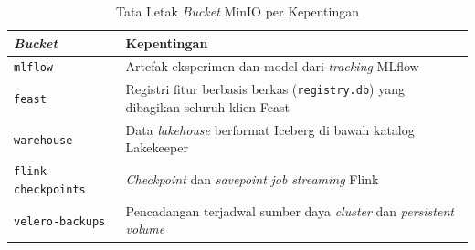 \begin{table}[!htb]
\centering
\caption{Tata Letak \textit{Bucket} MinIO per Kepentingan}
\label{tab:impl-minio-bucket}
\footnotesize
\setlength{\tabcolsep}{3pt}
\begin{tabular}{|>{\raggedright\arraybackslash}m{3.4cm}|>{\raggedright\arraybackslash}m{10.12cm}|}
\hline
\centering\arraybackslash\textbf{\textit{Bucket}} & \centering\arraybackslash\textbf{Kepentingan} \\
\hline
\texttt{mlflow} & Artefak eksperimen dan model dari \textit{tracking} MLflow \\
\hline
\texttt{feast} & Registri fitur berbasis berkas (\texttt{registry.db}) yang dibagikan seluruh klien Feast \\
\hline
\texttt{warehouse} & Data \textit{lakehouse} berformat Iceberg di bawah katalog Lakekeeper \\
\hline
\texttt{flink-checkpoints} & \textit{Checkpoint} dan \textit{savepoint} \textit{job} \textit{streaming} Flink \\
\hline
\texttt{velero-backups} & Pencadangan terjadwal sumber daya \textit{cluster} dan \textit{persistent volume} \\
\hline
\end{tabular}
\end{table}
